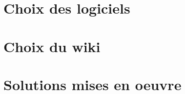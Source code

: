 \documentclass{article}
\begin{document}


\section{Choix des logiciels}



\section{Choix du wiki}



\section{Solutions mises en oeuvre}


\end{document}
